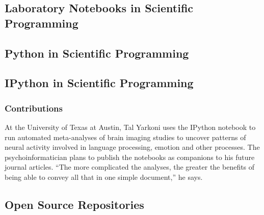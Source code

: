 \subsection{Laboratory Notebooks in Scientific Programming}

\subsection{Python in Scientific Programming}




\subsection{IPython in Scientific Programming}



\subsubsection{Contributions}


At the University of Texas at Austin, Tal Yarkoni
uses the IPython notebook to run automated
meta-analyses of brain imaging studies to
uncover patterns of neural activity involved in
language processing, emotion and other processes.
The psychoinformatician plans to publish
the notebooks as companions to his future
journal articles. “The more complicated the
analyses, the greater the benefits of being able to convey all that in one simple document,” he says.
\cite{shen2014interactive}

\subsection{Open Source Repositories}

